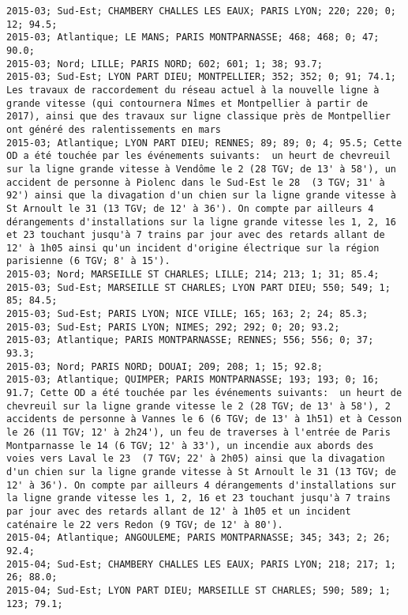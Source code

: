 \documentclass{article}
\begin{document}
\begin{Verbatim}[commandchars=\\\{\}]
2015-03; Sud-Est; CHAMBERY CHALLES LES EAUX; PARIS LYON; 220; 220; 0; 12; 94.5; 
2015-03; Atlantique; LE MANS; PARIS MONTPARNASSE; 468; 468; 0; 47; 90.0; 
2015-03; Nord; LILLE; PARIS NORD; 602; 601; 1; 38; 93.7; 
2015-03; Sud-Est; LYON PART DIEU; MONTPELLIER; 352; 352; 0; 91; 74.1; Les travaux de raccordement du réseau actuel à la nouvelle ligne à grande vitesse (qui contournera Nîmes et Montpellier à partir de 2017), ainsi que des travaux sur ligne classique près de Montpellier ont généré des ralentissements en mars
2015-03; Atlantique; LYON PART DIEU; RENNES; 89; 89; 0; 4; 95.5; Cette OD a été touchée par les événements suivants:  un heurt de chevreuil sur la ligne grande vitesse à Vendôme le 2 (28 TGV; de 13' à 58'), un accident de personne à Piolenc dans le Sud-Est le 28  (3 TGV; 31' à 92') ainsi que la divagation d'un chien sur la ligne grande vitesse à St Arnoult le 31 (13 TGV; de 12' à 36'). On compte par ailleurs 4 dérangements d'installations sur la ligne grande vitesse les 1, 2, 16 et 23 touchant jusqu'à 7 trains par jour avec des retards allant de 12' à 1h05 ainsi qu'un incident d'origine électrique sur la région parisienne (6 TGV; 8' à 15').
2015-03; Nord; MARSEILLE ST CHARLES; LILLE; 214; 213; 1; 31; 85.4; 
2015-03; Sud-Est; MARSEILLE ST CHARLES; LYON PART DIEU; 550; 549; 1; 85; 84.5; 
2015-03; Sud-Est; PARIS LYON; NICE VILLE; 165; 163; 2; 24; 85.3; 
2015-03; Sud-Est; PARIS LYON; NIMES; 292; 292; 0; 20; 93.2; 
2015-03; Atlantique; PARIS MONTPARNASSE; RENNES; 556; 556; 0; 37; 93.3; 
2015-03; Nord; PARIS NORD; DOUAI; 209; 208; 1; 15; 92.8; 
2015-03; Atlantique; QUIMPER; PARIS MONTPARNASSE; 193; 193; 0; 16; 91.7; Cette OD a été touchée par les événements suivants:  un heurt de chevreuil sur la ligne grande vitesse le 2 (28 TGV; de 13' à 58'), 2 accidents de personne à Vannes le 6 (6 TGV; de 13' à 1h51) et à Cesson le 26 (11 TGV; 12' à 2h24'), un feu de traverses à l'entrée de Paris Montparnasse le 14 (6 TGV; 12' à 33'), un incendie aux abords des voies vers Laval le 23  (7 TGV; 22' à 2h05) ainsi que la divagation d'un chien sur la ligne grande vitesse à St Arnoult le 31 (13 TGV; de 12' à 36'). On compte par ailleurs 4 dérangements d'installations sur la ligne grande vitesse les 1, 2, 16 et 23 touchant jusqu'à 7 trains par jour avec des retards allant de 12' à 1h05 et un incident caténaire le 22 vers Redon (9 TGV; de 12' à 80').
2015-04; Atlantique; ANGOULEME; PARIS MONTPARNASSE; 345; 343; 2; 26; 92.4; 
2015-04; Sud-Est; CHAMBERY CHALLES LES EAUX; PARIS LYON; 218; 217; 1; 26; 88.0; 
2015-04; Sud-Est; LYON PART DIEU; MARSEILLE ST CHARLES; 590; 589; 1; 123; 79.1; 

\end{Verbatim}
\end{document}

